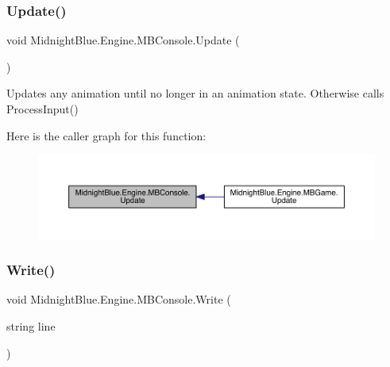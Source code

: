 \subsubsection{\texorpdfstring{Update()}{Update()}}
{\footnotesize\ttfamily void Midnight\+Blue.\+Engine.\+M\+B\+Console.\+Update (\begin{DoxyParamCaption}{ }\end{DoxyParamCaption})\hspace{0.3cm}{\ttfamily [inline]}}



Updates any animation until no longer in an animation state. Otherwise calls Process\+Input() 

Here is the caller graph for this function\+:
\nopagebreak
\begin{figure}[H]
\begin{center}
\leavevmode
\includegraphics[width=350pt]{class_midnight_blue_1_1_engine_1_1_m_b_console_a94e6b48373f8dda4137ad79ecea8a40d_icgraph}
\end{center}
\end{figure}
\hypertarget{class_midnight_blue_1_1_engine_1_1_m_b_console_ac1a75f46018d9e2c1132f2e77160ea48}{}\label{class_midnight_blue_1_1_engine_1_1_m_b_console_ac1a75f46018d9e2c1132f2e77160ea48} 
\subsubsection{\texorpdfstring{Write()}{Write()}\hspace{0.1cm}{\footnotesize\ttfamily [1/3]}}
{\footnotesize\ttfamily void Midnight\+Blue.\+Engine.\+M\+B\+Console.\+Write (\begin{DoxyParamCaption}\item[{string}]{line }\end{DoxyParamCaption})\hspace{0.3cm}{\ttfamily [inline]}}



